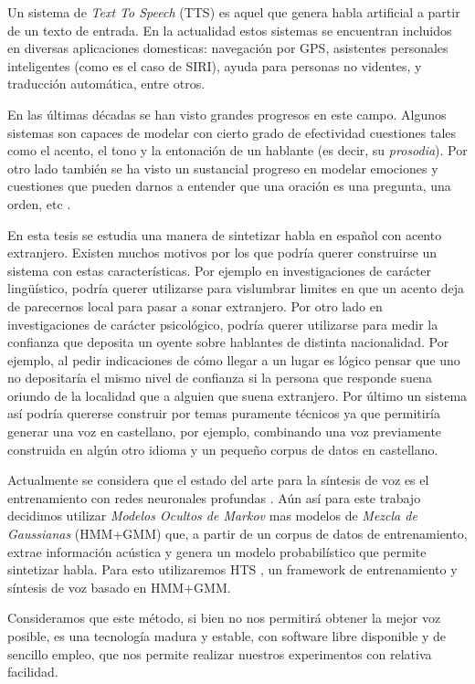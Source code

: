 Un sistema de \textit{Text To Speech} (TTS) es aquel que genera habla artificial a partir de un texto de entrada. En la actualidad estos sistemas se encuentran incluidos en diversas aplicaciones domesticas: navegación por GPS, asistentes personales inteligentes (como es el caso de SIRI), ayuda para personas no videntes, y traducción automática, entre otros.


En las últimas décadas se han visto grandes progresos en este campo. Algunos sistemas son capaces de modelar con cierto grado de efectividad cuestiones tales como el acento, el tono y la entonación de un hablante (es decir, su \textit{prosodia}). Por otro lado también se ha visto un sustancial progreso en modelar emociones y cuestiones que pueden darnos a entender que una oración es una pregunta, una orden, etc \cite{prosodiaYEntonacion} \cite{prosodiaYEntonacion2}. 


En esta tesis se estudia una manera de sintetizar habla en español con acento extranjero. Existen muchos motivos por los que podría querer construirse un sistema con estas características. Por ejemplo en investigaciones de carácter lingüístico, podría querer utilizarse para vislumbrar limites en que un acento deja de parecernos local para pasar a sonar extranjero. Por otro lado en investigaciones de carácter psicológico, podría querer utilizarse para medir la confianza que deposita un oyente sobre hablantes de distinta nacionalidad. Por ejemplo, al pedir indicaciones de cómo llegar a un lugar es lógico pensar que uno no depositaría el mismo nivel de confianza si la persona que responde suena oriundo de la localidad que a alguien que suena extranjero. Por último un sistema así podría quererse construir por temas puramente técnicos ya que permitiría generar una voz en castellano, por ejemplo, combinando una voz previamente construida en algún otro idioma y un pequeño corpus de datos en castellano.


Actualmente se considera que el estado del arte para la síntesis de voz es el entrenamiento con redes neuronales profundas \cite{redesProfundas} \cite{redesProfundas2}. Aún así para este trabajo decidimos utilizar \textit{Modelos Ocultos de Markov} mas modelos de \textit{Mezcla de Gaussianas} (HMM+GMM) que, a partir de un corpus de datos de entrenamiento, extrae información acústica y genera un modelo probabilístico que permite sintetizar habla. Para esto utilizaremos HTS \cite{hts}, un framework de entrenamiento y síntesis de voz basado en HMM+GMM.


Consideramos que este método, si bien no nos permitirá obtener la mejor voz posible, es una tecnología madura y estable, con software libre disponible y de sencillo empleo, que nos permite realizar nuestros experimentos con relativa facilidad.


